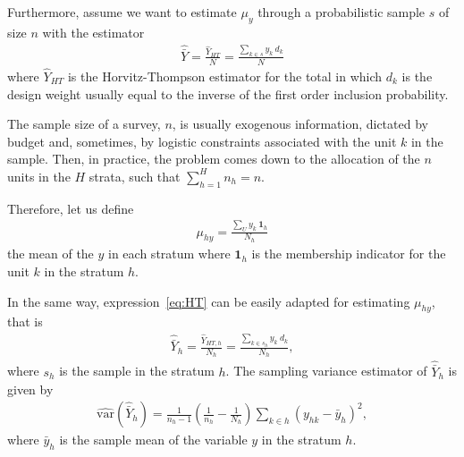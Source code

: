 Furthermore, assume we want to estimate $\mu_{y}$ through a probabilistic sample $s$ of size $n$ with the estimator
\begin{eqnarray}
	\label{eq:HT}
	\hat{\bar{Y}} = \frac{\hat{Y}_{HT}}{N} = \frac{\sum_{k \in s} y_k \ d_k}{N}
\end{eqnarray}
where $\hat{Y}_{HT}$ is the Horvitz-Thompson estimator for the total \citep{horvitz1952generalization} in which $d_k$ is the design weight usually equal to the inverse of the first order inclusion probability.

The sample size of a survey, $n$, is usually exogenous information, dictated by budget and, sometimes, by logistic constraints associated with the unit $k$ in the sample.
Then, in practice, the problem comes down to the allocation of the $n$ units in the $H$ strata, such that $\sum_{h=1}^H n_h=n$.

Therefore, let us define 
\begin{eqnarray}
	\label{eq:meanPOPstr}
	\mu_{hy} = \frac{\sum_{U} y_k \ \boldsymbol{1}_h}{N_h}
\end{eqnarray}
the mean of the $y$ in each stratum where $\boldsymbol{1}_h$ is the membership indicator for the unit $k$ in the stratum $h$.


In the same way, expression~\eqref{eq:HT} can be easily adapted for estimating $\mu_{hy}$, that is
\begin{eqnarray}
	\label{eq:HTh}
	\hat{\bar{Y}}_h = \frac{\hat{Y}_{HT,h}}{N_h} = \frac{\sum_{k \in s_h} y_k \ d_k}{N_h},
\end{eqnarray}
where $s_h$ is the sample in the stratum $h$.
The sampling variance estimator of $\hat{\bar{Y}}_h$ is given by
\begin{eqnarray}
	\label{eq:varHTh}
	\widehat{\text{var}} \left(\hat{\bar{Y}}_h \right) =
	\frac{1}{n_h - 1} \left(\frac{1}{n_h} - \frac{1}{N_h} \right)
	\sum_{k \in h} (y_{hk} - \bar{y}_h)^2,
\end{eqnarray}
where $\bar{y}_h$ is the sample mean of the variable $y$ in the stratum $h$. 

